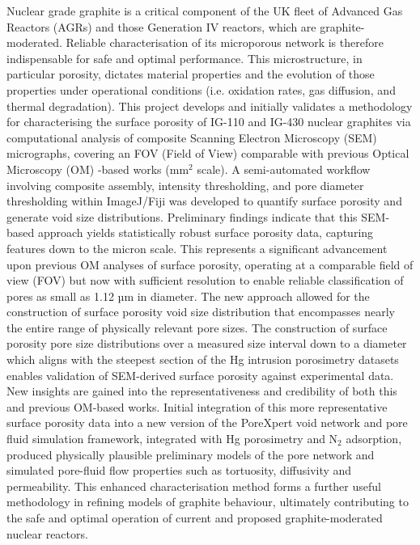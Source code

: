 \documentclass[12pt,a4paper]{report}
\begin{document}
Nuclear grade graphite is a critical component of the UK fleet of Advanced Gas Reactors (AGRs) and those Generation IV reactors, which are graphite-moderated. Reliable characterisation of its microporous network is therefore indispensable for safe and optimal performance. This microstructure, in particular porosity, dictates material properties and the evolution of those properties under operational conditions (i.e. oxidation rates, gas diffusion, and thermal degradation). This project develops and initially validates a methodology for characterising the surface porosity of IG-110 and IG-430 nuclear graphites via computational analysis of composite Scanning Electron Microscopy (SEM) micrographs, covering an FOV (Field of View) comparable with previous Optical Microscopy (OM) -based works (mm\(^2\) scale). A semi-automated workflow involving composite assembly, intensity thresholding, and pore diameter thresholding within ImageJ/Fiji was developed to quantify surface porosity and generate void size distributions. Preliminary findings indicate that this SEM-based approach yields statistically robust surface porosity data, capturing features down to the micron scale. This represents a significant advancement upon previous OM analyses of surface porosity, operating at a comparable field of view (FOV) but now with sufficient resolution to enable reliable classification of pores as small as 1.12 µm in diameter. The new approach allowed for the construction of surface porosity void size distribution that encompasses nearly the entire range of physically relevant pore sizes. The construction of surface porosity pore size distributions over a measured size interval down to a diameter which aligns with the steepest section of the Hg intrusion porosimetry datasets enables validation of SEM-derived surface porosity against experimental data. New insights are gained into the representativeness and credibility of both this and previous OM-based works. Initial integration of this more representative surface porosity data into a new version of the PoreXpert void network and pore fluid simulation framework, integrated with Hg porosimetry and N$_2$ adsorption, produced physically plausible preliminary models of the pore network and simulated pore-fluid flow properties such as tortuosity, diffusivity and permeability.  This enhanced characterisation method forms a further useful methodology in refining models of graphite behaviour, ultimately contributing to the safe and optimal operation of current and proposed graphite-moderated nuclear reactors.
\end{document}
